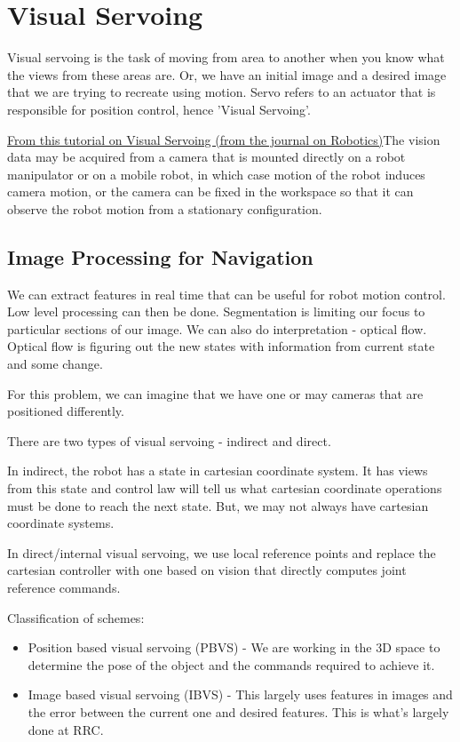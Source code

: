 \chapter{Visual Servoing}

Visual servoing is the task of moving from area to another when you know what the views from these areas are. Or, we have an initial image and a desired image that we are trying to recreate using motion. Servo refers to an actuator that is responsible for position control, hence 'Visual Servoing'.

\href{https://libgen.lc/scimag/ads.php?doi=10.1109/mra.2006.250573}{From this tutorial on Visual Servoing (from the journal on Robotics)}The  vision  data  may  be acquired  from  a  camera  that  is  mounted  directly  on  a  robot manipulator  or  on  a  mobile  robot,  in  which  case  motion  of the robot induces camera motion, or the camera can be fixed in the workspace so that it can observe the robot motion from a stationary configuration.

\section{Image Processing for Navigation}

We can extract features in real time that can be useful for robot motion control. Low level processing can then be done. Segmentation is limiting our focus to particular sections of our image. We can also do interpretation - optical flow. Optical flow is figuring out the new states with information from current state and some change.

For this problem, we can imagine that we have one or may cameras that are positioned differently.

There are two types of visual servoing - indirect and direct.

In indirect, the robot has a state in cartesian coordinate system. It has views from this state and control law will tell us what cartesian coordinate operations must be done to reach the next state. But, we may not always have cartesian coordinate systems.

In direct/internal visual servoing, we use local reference points and replace the cartesian controller with one based on vision that directly computes joint reference commands. 

Classification of schemes:

\begin{itemize}
    \item Position based visual servoing (PBVS) - We are working in the 3D space to determine the pose of the object and the commands required to achieve it. 
    \item Image based visual servoing (IBVS) - This largely uses features in images and the error between the current one and desired features. This is what's largely done at RRC.
\end{itemize}


